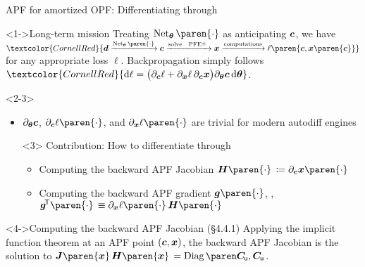 \begin{frame}[t]{APF for amortized OPF: Differentiating through \APFE}{}
    \begin{exampleblock}<1->{Long-term mission}
        Treating \(\operatorname{Net}_{\boldsymbol{\theta}}\paren{\cdot}\)
        as anticipating \(\boldsymbol{c}\),
        we have
        \(\textcolor{CornellRed}{\DemDrws
        \xrightarrow{\operatorname{Net}_{\boldsymbol{\theta}}\paren{\cdot}}
        \SupInjs \xrightarrow{\text{solve \APFE}} \PFEVars \xrightarrow{\text{computations}}
        \ell\paren{\SupInjs,\PFEVars\paren{\SupInjs}}}\)
        for any appropriate loss \(\ell\).
        Backpropagation simply follows
        \textcolor{CornellRed}{
        \(\textcolor{CornellRed}{\odif{\ell} =
        \bigl(\partial_{\SupInjs}\ell + \partial_{\PFEVars}\ell\, \partial_{\SupInjs}\PFEVars\bigr)
        \partial_{\boldsymbol{\theta}}\SupInjs \odif{\boldsymbol{\theta}}}\)}.
    \end{exampleblock}

    \begin{overlayarea}{\textwidth}{\textheight}
    \begin{onlyenv}<2-3>
    \begin{itemize}
        \item <2-3> \(\partial_{\boldsymbol{\theta}}\boldsymbol{c}\),
            \(\partial_{\SupInjs}\ell\paren{\cdot}\),
            and \(\partial_{\PFEVars}\ell\paren{\cdot}\)
            are \textcolor<2>{CornellRed}{trivial for modern autodiff engines}

        \item[\ding{43}] <3> Contribution: How to differentiate through \APFE
        \begin{itemize}
            \item <3> Computing the
                \textcolor<3>{CornellRed}{backward APF Jacobian
                \(\APFJac[b]\paren{\cdot} \,\coloneqq \partial_{\SupInjs}\PFEVars\paren{\cdot}\)}
            \item <3> Computing the
                \textcolor<3>{CornellRed}{backward APF gradient
                \(\APFBGrad\paren{\cdot}\)},
                \ie,
                \(\APFBGrad^{\!\mathsf{T}}\paren{\cdot} \,\equiv
                \partial_{\PFEVars}\ell\paren{\cdot}\,\APFJac[b]\paren{\cdot}\)
        \end{itemize}
    \end{itemize}
    \end{onlyenv}

    \begin{block}<4->{Computing the backward APF Jacobian (\S 4.4.1)}
        Applying the implicit function theorem at an APF point \(\left(\boldsymbol{c},\boldsymbol{x}\right)\),
        the \textcolor{CornellRed}{backward APF Jacobian} is the solution to
        \textcolor{CornellRed}{
        \(\APFJac\paren{\PFEVars}\,\APFJac[b]\paren{\PFEVars} \,= \Diag{\SupCon,\SupCon}\)}.
    \end{block}


\end{overlayarea}
\end{frame}
